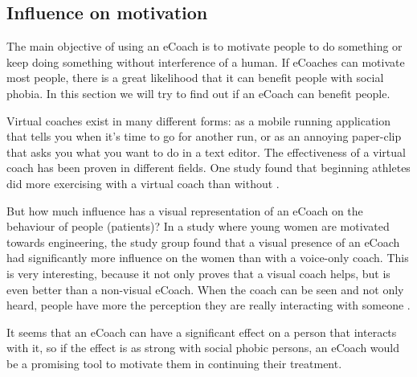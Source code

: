 \documentclass[twoside]{article}
\begin{document}
\begin{multicols}{2}

\section{Influence on motivation}
The main objective of using an eCoach is to motivate people to do something or keep doing something without interference of a human\cite{rosset2005}. If eCoaches can motivate most people, there is a great likelihood that it can benefit people with social phobia. In this section we will try to find out if an eCoach can benefit people.

Virtual coaches exist in many different forms: as a mobile running application that tells you when it's time to go for another run, or as an annoying paper-clip that asks you what you want to do in a text editor.  The effectiveness of a virtual coach has been proven in different fields. One study found that beginning athletes did more exercising with a virtual coach than without \cite{eyck2006effect}. 

But how much influence has a visual representation of an eCoach on the behaviour of people (patients)? In a study \cite{rosenberg2007importance} where young women are motivated towards engineering, the study group found that a visual presence of an eCoach had significantly more influence on the women than with a voice-only coach. This is very interesting, because it not only proves that a visual coach helps, but is even better than a non-visual eCoach. When the coach can be seen and not only heard, people have more the perception they are really interacting with someone \cite{baylor2009promoting}. 

It seems that an eCoach can have a significant effect on a person that interacts with it, so if the effect is as strong with social phobic persons, an eCoach would be a promising tool to motivate them in continuing their treatment.




\end{multicols}
\end{document}
